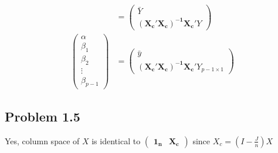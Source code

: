 \documentclass[a4paper]{article}
\begin{document}
\begin{align*}
&= \begin{pmatrix}
\bar{Y}\\
\mathbf{(X_c'X_c)^{-1}X_c}'Y
\end{pmatrix}\\
\begin{pmatrix}
\alpha\\
\beta_1\\
\beta_2\\
\vdots\\
\beta_{p-1}\end{pmatrix} &= \begin{pmatrix}
\bar{y}\\
\mathbf{(X_c'X_c)^{-1}X_c}'Y_{p-1\times 1}
\end{pmatrix}
\end{align*}


\subsection*{Problem 1.5}

Yes, column space of $X$ is identical to $\begin{pmatrix}
\mathbf{1_n} & \mathbf{X_c}
\end{pmatrix}$ since $X_c = (I-\frac{J}{n})X$
\end{document}
